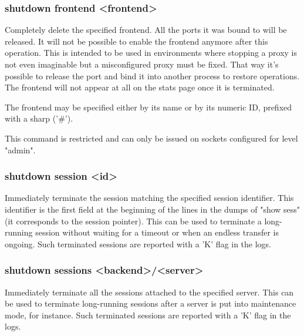 \subsubsection[shutdown frontend]{shutdown frontend <frontend>}
  Completely delete the specified frontend. All the ports it was bound to will
  be released. It will not be possible to enable the frontend anymore after
  this operation. This is intended to be used in environments where stopping a
  proxy is not even imaginable but a misconfigured proxy must be fixed. That
  way it's possible to release the port and bind it into another process to
  restore operations. The frontend will not appear at all on the stats page
  once it is terminated.

  The frontend may be specified either by its name or by its numeric ID,
  prefixed with a sharp ('\#').

  This command is restricted and can only be issued on sockets configured for
  level "admin".

\subsubsection[shutdown session]{shutdown session <id>}
  Immediately terminate the session matching the specified session identifier.
  This identifier is the first field at the beginning of the lines in the dumps
  of "show sess" (it corresponds to the session pointer). This can be used to
  terminate a long-running session without waiting for a timeout or when an
  endless transfer is ongoing. Such terminated sessions are reported with a 'K'
  flag in the logs.

\subsubsection[shutdown sessions]{shutdown sessions <backend>/<server>}
  Immediately terminate all the sessions attached to the specified server. This
  can be used to terminate long-running sessions after a server is put into
  maintenance mode, for instance. Such terminated sessions are reported with a
  'K' flag in the logs.